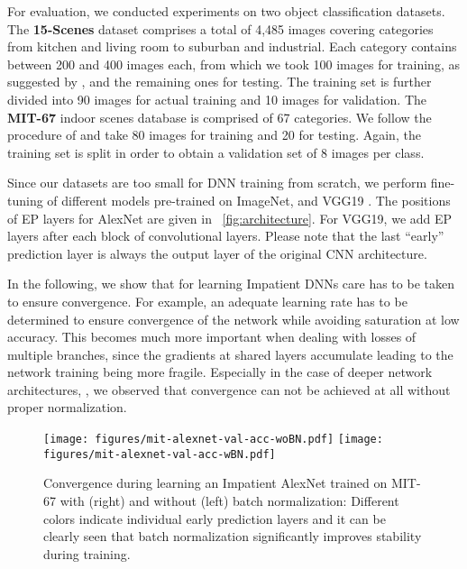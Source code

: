 \documentclass{bmvc2k}
\begin{document}
    For evaluation, we conducted experiments on two object classification datasets.
    The \textbf{15-Scenes} \cite{lazebnik2006beyond} dataset comprises a total of 4,485 images covering categories from kitchen and living room to suburban and industrial.
    Each category contains between 200 and 400 images each, from which we took 100 images for training, as suggested by \cite{lazebnik2006beyond},
    and the remaining ones for testing.
    The training set is further divided into 90 images for actual training and 10 images for validation.
    The \textbf{MIT-67} \cite{quattoni2009recognizing} indoor scenes database is comprised of 67 categories.
    We follow the procedure of \cite{quattoni2009recognizing} and take 80 images for training and 20 for testing.
    Again, the training set is split in order to obtain a validation set of 8 images per class.



    Since our datasets are too small for DNN training from scratch, we perform fine-tuning of different models pre-trained on ImageNet, \eg\AlexNet \cite{krizhevsky2012imagenet} and VGG19 \cite{simonyan2014very}. The positions of EP layers for AlexNet are given in
    \figurename~\ref{fig:architecture}. For VGG19, we add EP layers after each block of convolutional layers. Please note that the last ``early'' prediction layer is always the output layer of the original CNN architecture.



    In the following, we show that for learning Impatient DNNs care has to be taken to ensure convergence.
    For example, an adequate learning rate has to be determined to ensure convergence of the network while avoiding saturation at low accuracy.
    This becomes much more important when dealing with losses of multiple branches, since the gradients at shared layers accumulate
    leading to the network training being more fragile.
    Especially in the case of deeper network architectures, \eg\VGG, we observed that convergence can not be achieved at all without proper normalization.

    \begin{figure}[t]
        \centering
        \texttt{[image: figures/mit-alexnet-val-acc-woBN.pdf]} \hfil %
        \texttt{[image: figures/mit-alexnet-val-acc-wBN.pdf]}  %
        \caption{Convergence during learning an Impatient AlexNet trained on MIT-67 with (right) and without (left) batch normalization:
            Different colors indicate individual early prediction layers and it can be clearly seen that batch normalization significantly improves
            stability during training.
        }
        \label{fig:experiments:batchNormPlot}
    \end{figure}
\end{document}
